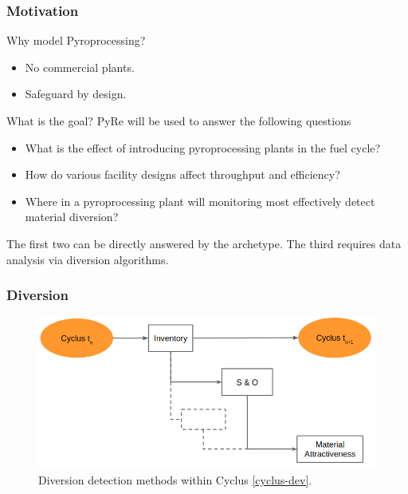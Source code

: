 \begin{frame}
  \frametitle{Motivation}
  \begin{block}{Why model Pyroprocessing?}
  	\begin{itemize}
  		\item No commercial plants.
  		\item Safeguard by design.
  	\end{itemize}
  \end{block}
 \begin{block}{What is the goal?}
 	PyRe will be used to answer the following questions
 	\begin{itemize}
 		\item What is the effect of introducing pyroprocessing plants in the fuel cycle?
 		\item How do various facility designs affect throughput and efficiency?
 		\item Where in a pyroprocessing plant will monitoring most 
 		effectively detect material diversion?
 	\end{itemize}
\end{block}
The first two can be directly answered by the archetype. The third requires data analysis via
diversion algorithms.	
\end{frame}

\begin{frame}
  \frametitle{Diversion}
        \begin{figure}
        	\centering
        	\includegraphics[width=0.9\linewidth]{diversion1}
        	\caption{Diversion detection methods within Cyclus \ref{cyclus-dev}.}
        \end{figure}
\end{frame}
